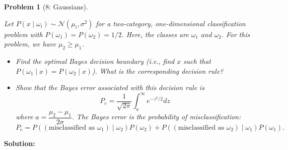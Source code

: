 \documentclass[11pt]{exam}
\theoremstyle{quest}
\newtheorem*{question}{Problem}
\begin{document}
\begin{question}[8: Gaussians]
~

Let $P(x \mid \omega_i) \sim \mathcal{N}(\mu_i,\sigma^2)$ for a two-category, one-dimensional classification problem with $P(\omega_1)=P(\omega_2)=1/2$. Here, the classes are $\omega_{1}$ and $\omega_{2}$. For this problem, we have $\mu_{2} \geq \mu_{1}$.
\begin{itemize}
\item[(a)] Find the optimal Bayes decision boundary (i.e., find $x$ such that $P(\omega_{1} \mid x) = P(\omega_{2} \mid x)$). What is the corresponding decision rule?
\item[(b)] Show that the Bayes error associated with this decision rule is
\begin{equation*}
P_e=\frac{1}{\sqrt{2\pi}}\int_{a}^{\infty} e^{-z^{2}/2}dz
\end{equation*}
where $a=\dfrac{\mu_2 - \mu_1}{2\sigma}$. The Bayes error is the probability of misclassification: $$P_{e} = P((\text{misclassified as }\omega_{1}) \mid \omega_{2}) P(\omega_{2}) + P((\text{misclassified as }\omega_{2}) \mid \omega_{1}) P(\omega_{1}).$$
\end{itemize}
\end{question}
\textbf{Solution:}
\end{document}
